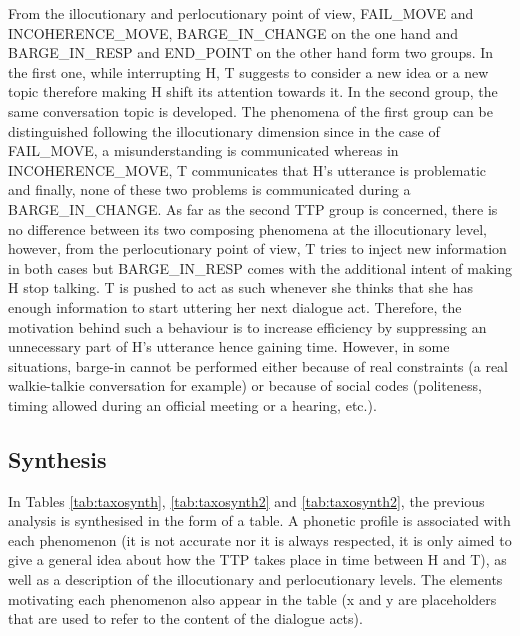          From the illocutionary and perlocutionary point of view, FAIL\_MOVE and INCOHERENCE\_MOVE, BARGE\_IN\_CHANGE on the one hand and BARGE\_IN\_RESP and END\_POINT on the other hand form two groups. In the first one, while interrupting H, T suggests to consider a new idea or a new topic therefore making H shift its attention towards it. In the second group, the same conversation topic is developed. The phenomena of the first group can be distinguished following the illocutionary dimension since in the case of FAIL\_MOVE, a misunderstanding is communicated whereas in INCOHERENCE\_MOVE, T communicates that H's utterance is problematic and finally, none of these two problems is communicated during a BARGE\_IN\_CHANGE. As far as the second TTP group is concerned, there is no difference between its two composing phenomena at the illocutionary level, however, from the perlocutionary point of view, T tries to inject new information in both cases but BARGE\_IN\_RESP comes with the additional intent of making H stop talking. T is pushed to act as such whenever she thinks that she has enough information to start uttering her next dialogue act. Therefore, the motivation behind such a behaviour is to increase efficiency by suppressing an unnecessary part of H's utterance hence gaining time. However, in some situations, barge-in cannot be performed either because of real constraints (a real walkie-talkie conversation for example) or because of social codes (politeness, timing allowed during an official meeting or a hearing, etc.).
				
		\subsection{Synthesis}
		
			In Tables \ref{tab:taxosynth}, \ref{tab:taxosynth2} and \ref{tab:taxosynth2}, the previous analysis is synthesised in the form of a table. A phonetic profile is associated with each phenomenon (it is not accurate nor it is always respected, it is only aimed to give a general idea about how the TTP takes place in time between H and T), as well as a description of the illocutionary and perlocutionary levels. The elements motivating each phenomenon also appear in the table (x and y are placeholders that are used to refer to the content of the dialogue acts).
		
